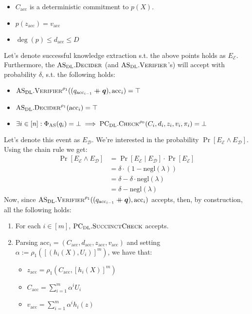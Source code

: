 \documentclass[
]{article}
\providecommand{\tightlist}{%
  \setlength{\itemsep}{0pt}\setlength{\parskip}{0pt}}
\newcommand*\Dc{\mathcal{D}}
\newcommand*\Ec{\mathcal{E}}
\renewcommand*\a{\alpha}
\renewcommand*\d{\delta}
\renewcommand*\l{\lambda}
\newcommand*\cat{\mathbin{+\mkern-10mu+}}
\renewcommand{\vec}[1]{ \boldsymbol{#1} }
\newcommand*{\negl}{\text{negl}}
\newcommand*{\acc}{\mathrm{acc}}
\newcommand*{\AS}{\text{AS}}
\newcommand*{\PCDL}{\text{PC}_{\text{DL}}}
\newcommand*{\PCDLSuccinctCheck}{\PCDL.\mathrm{\text{S{\scriptsize UCCINCT}C{\scriptsize HECK}}}}
\newcommand*{\PCDLCheck}{\PCDL.\mathrm{\text{C\scriptsize HECK}}}
\newcommand*{\ASDL}{\text{AS}_{\text{DL}}}
\newcommand*{\ASDLVerifier}{\ASDL.\mathrm{\text{V\scriptsize ERIFIER}}}
\newcommand*{\ASDLDecider}{\ASDL.\mathrm{\text{D\scriptsize ECIDER}}}
\begin{document}
\begin{itemize}
\tightlist
\item
  \(C_\acc\) is a deterministic commitment to \(p(X)\).
\item
  \(p(z_\acc) = v_\acc\)
\item
  \(\deg(p) \leq d_\acc \leq D\)
\end{itemize}

Let's denote successful knowledge extraction s.t. the above points holds
as \(E_\Ec\). Furthermore, the \(\ASDLDecider\) (and
\(\ASDLVerifier\)'s) will accept with probability \(\d\), s.t. the
following holds:

\begin{itemize}
\tightlist
\item
  \(\ASDLVerifier^{\rho_1}((q_{\acc_{i-1}} \cat \vec{q}), \acc_i) = \top\)
\item
  \(\ASDLDecider^{\rho_1}(\acc_i) = \top\)
\item
  \(\exists i \in [n] : \Phi_\AS(q_i) = \bot \implies \PCDLCheck^{\rho_0}(C_i, d_i, z_i, v_i, \pi_i) = \bot\)
\end{itemize}

Let's denote this event as \(E_\Dc\). We're interested in the
probability \(\Pr[E_\Ec
\land E_\Dc]\). Using the chain rule we get: \[
\begin{aligned}
  \Pr[E_\Ec \land E_\Dc] &= \Pr[E_\Ec \; | \; E_\Dc] \cdot \Pr[E_\Ec] \\
                         &= \d \cdot (1 - \negl(\l)) \\
                         &= \d - \d \cdot \negl(\l) \\
                         &= \d - \negl(\l)
\end{aligned}
\] Now, since
\(\ASDLVerifier^{\rho_1}((q_{\acc_{i-1}} \cat \vec{q}), \acc_i)\)
accepts, then, by construction, all the following holds:

\begin{enumerate}
\def\labelenumi{\arabic{enumi}.}
\tightlist
\item
  For each \(i \in [m]\), \(\PCDLSuccinctCheck\) accepts.
\item
  Parsing \(\acc_i = (C_\acc, d_\acc, z_\acc, v_\acc)\) and setting
  \(\a := \rho_1([(h_i(X), U_i)]^m)\), we have that:

  \begin{itemize}
  \tightlist
  \item
    \(z_\acc = \rho_1(C_\acc, [h_i(X)]^m)\)
  \item
    \(C_\acc = \sum_{i=1}^m \alpha^i U_i\)
  \item
    \(v_\acc = \sum_{i=1}^m \alpha^i h_i(z)\)
  \end{itemize}
\end{enumerate}
\end{document}
